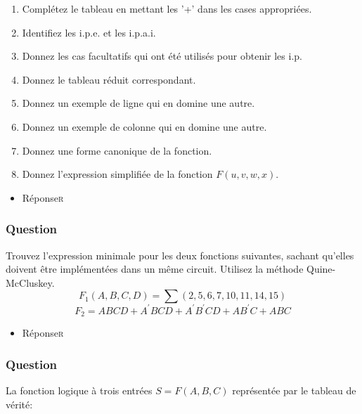 \documentclass[11pt]{article}
\begin{document}
\begin{enumerate}
\item Complétez le tableau en mettant les '+' dans les cases
appropriées.

\item Identifiez les i.p.e. et les i.p.a.i.

\item Donnez les cas facultatifs qui ont été utilisés pour obtenir les
i.p.

\item Donnez le tableau réduit correspondant.

\item Donnez un exemple de ligne qui en domine une autre.

\item Donnez un exemple de colonne qui en domine une autre.

\item Donnez une forme canonique de la fonction.

\item Donnez l'expression simplifiée de la fonction \(F(u,v,w,x)\).
\end{enumerate}


\begin{itemize}
\item Réponse\hfill{}\textsc{r}
\label{sec:org5fad608}
\end{itemize}

\subsubsection*{Question}
\label{sec:orgcc03ce5}
Trouvez l'expression minimale pour les deux fonctions suivantes,
   sachant qu'elles doivent être implémentées dans un même
   circuit. Utilisez la méthode Quine-McCluskey.
   $$
     F_1(A, B, C, D)
     =\sum(2,5,6,7,10,11,14,15)
     $$
   $$
     F_2 = A B C D + A^\prime B C D +
     A^\prime B^\prime C D + A B^\prime C + ABC
     $$

\begin{itemize}
\item Réponse\hfill{}\textsc{r}
\label{sec:org640ae9c}
\end{itemize}

\subsubsection*{Question}
\label{sec:orgc9544a0}
La fonction logique à trois entrées \(S = F(A,B,C)\) représentée par le
  tableau de vérité:
\end{document}
